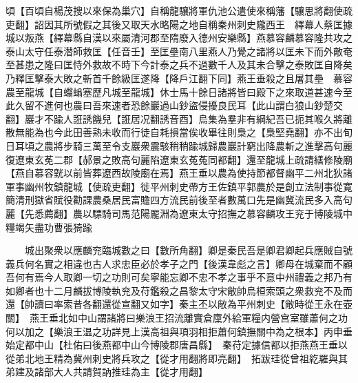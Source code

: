 頃【百頃自楊茂搜以來保為巢穴】自稱龍驤將軍仇池公遣使來稱藩【驤思將翻使疏吏翻】詔因其所號假之其後又取天水略陽之地自稱秦州刺史隴西王　繹幕人蔡匡據城以叛燕【繹幕縣自漢以來屬清河郡至隋廢入德州安樂縣】燕慕容麟慕容隆共攻之泰山太守任泰潜師救匡【任音壬】至匡壘南八里燕人乃覺之諸將以匡未下而外敵奄至甚患之隆曰匡恃外救故不時下今計泰之兵不過數千人及其未合擊之泰敗匡自降矣乃釋匡擊泰大敗之斬首千餘級匡遂降【降戶江翻下同】燕王垂殺之且屠其壘　慕容農至龍城【自蠮螉塞歷凡城至龍城】休士馬十餘日諸將皆曰殿下之來取道甚速今至此久留不進何也農曰吾來速者恐餘巖過山鈔盜侵擾良民耳【此山謂白狼山鈔楚交翻】巖才不踰人誑誘饑兒【誑居况翻誘音酉】烏集為羣非有綱紀吾已扼其喉久將離散無能為也今此田善熟未收而行徒自耗損當俟收畢往則梟之【梟堅堯翻】亦不出旬日耳頃之農將步騎三萬至令支巖衆震駭稍稍踰城歸農巖計窮出降農斬之進擊高句麗復遼東玄莬二郡【郝景之敗高句麗陷遼東玄菟菟同都翻】還至龍城上疏請繕修陵廟【燕自慕容皝以前皆葬遼西故陵廟在焉】燕王垂以農為使持節都督幽平二州北狄諸軍事幽州牧鎮龍城【使疏吏翻】徙平州刺史帶方王佐鎮平郭農於是創立法制事從寛簡清刑獄省賦役勸課農桑居民富贍四方流民前後至者數萬口先是幽冀流民多入高句麗【先悉薦翻】農以驃騎司馬范陽龎淵為遼東太守招撫之慕容麟攻王兖于博陵城中糧竭矢盡功曹張猗踰

　　城出聚衆以應麟兖臨城數之曰【數所角翻】卿是秦民吾是卿君卿起兵應賊自號義兵何名實之相違也古人求忠臣必於孝子之門【後漢韋彪之言】卿母在城棄而不顧吾何有焉今人取卿一切之功則可矣寧能忘卿不忠不孝之事乎不意中州禮義之邦乃有如卿者也十二月麟拔博陵執兖及苻鑑殺之昌黎太守宋敞帥烏桓索頭之衆救兖不及而還【帥讀曰率索昔各翻還從宣翻又如字】秦主丕以敞為平州刺史【敞時從王永在壺關】　燕王垂北如中山謂諸將曰樂浪王招流離實倉廩外給軍糧内營宫室雖蕭何之功何以加之【樂浪王温之功詳見上漢高祖與項羽相拒蕭何鎮撫關中為之根本】丙申垂始定都中山【杜佑曰後燕都中山今博陵郡唐昌縣】　秦苻定據信都以拒燕燕王垂以從弟北地王精為冀州刺史將兵攻之【從才用翻將即亮翻】　拓跋珪從曾祖紇羅與其弟建及諸部大人共請賀訥推珪為主【從才用翻】

